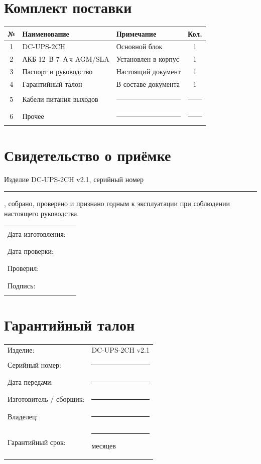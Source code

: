 \documentclass[11pt,a4paper]{article}
\newcommand{\hwversion}{v2.1}%
\begin{document}
\section{Комплект поставки}
\begin{tabularx}{\textwidth}{@{}clXc@{}}
\toprule
№ & \textbf{Наименование} & \textbf{Примечание} & \textbf{Кол.} \\
\midrule
1 & DC-UPS-2CH & Основной блок & 1 \\
2 & АКБ 12~В 7~А\,ч AGM/SLA & Установлен в корпус & 1 \\
3 & Паспорт и руководство & Настоящий документ & 1 \\
4 & Гарантийный талон & В составе документа & 1 \\
5 & Кабели питания выходов & \rule{55mm}{0.4pt} & \rule{10mm}{0.4pt} \\
6 & Прочее & \rule{55mm}{0.4pt} & \rule{10mm}{0.4pt} \\
\bottomrule
\end{tabularx}

\section{Свидетельство о приёмке}
Изделие DC-UPS-2CH \hwversion, серийный номер \rule{50mm}{0.4pt}, собрано, проверено и признано годным к эксплуатации при соблюдении настоящего руководства.

\vspace{5mm}
\begin{tabular}{@{}p{55mm}p{90mm}@{}}
Дата изготовления: & \rule{65mm}{0.4pt} \\
Дата проверки: & \rule{65mm}{0.4pt} \\
Проверил: & \rule{65mm}{0.4pt} \\
Подпись: & \rule{65mm}{0.4pt} \\
\end{tabular}

\newpage
\section{Гарантийный талон}

\begin{tcolorbox}[colback=white,colframe=accent,boxrule=1pt,arc=2mm]
\begin{tabular}{@{}p{55mm}p{90mm}@{}}
Изделие: & DC-UPS-2CH \hwversion \\
Серийный номер: & \rule{65mm}{0.4pt} \\
Дата передачи: & \rule{65mm}{0.4pt} \\
Изготовитель / сборщик: & \rule{65mm}{0.4pt} \\
Владелец: & \rule{65mm}{0.4pt} \\
Гарантийный срок: & \rule{30mm}{0.4pt} месяцев \\
\end{tabular}
\end{tcolorbox}
\end{document}
